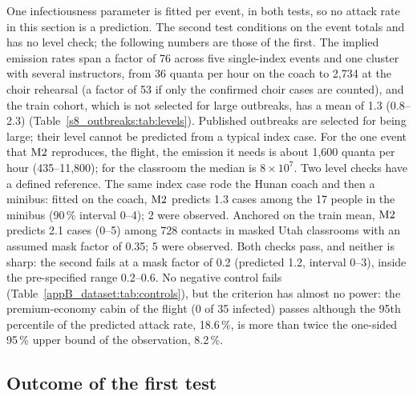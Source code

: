 One infectiousness parameter is fitted per event, in both tests, so no attack rate in this section is a
prediction. The second test conditions on the event totals and has no level check; the following numbers are
those of the first. The
implied emission rates span a factor of 76 across five single-index events and one cluster with several
instructors, from 36 quanta per hour on the coach to 2{,}734 at the choir rehearsal (a factor of 53 if only the confirmed choir cases are counted), and
the train cohort, which is not selected for large outbreaks, has a mean of 1.3 (0.8--2.3)
(Table~\ref{s8_outbreaks:tab:levels}). Published outbreaks are selected for being large; their level cannot be
predicted from a typical index case.
For the one event that $\mathrm{M2}$ reproduces, the flight, the emission it needs is about 1{,}600 quanta per hour
(435--11{,}800); for the classroom the median is $8\times10^{7}$.
Two level checks have a defined reference. The same index case rode the Hunan coach and then a minibus:
fitted on the coach, $\mathrm{M2}$ predicts 1.3 cases among the 17 people in the minibus (90\,\% interval 0--4); 2
were observed. Anchored on the train mean, $\mathrm{M2}$ predicts 2.1 cases (0--5) among 728 contacts in masked Utah
classrooms \citep{hershow2021} with an assumed mask factor of 0.35; 5 were observed. Both checks pass, and
neither is sharp: the second fails at a mask factor of 0.2 (predicted 1.2, interval 0--3), inside the
pre-specified range 0.2--0.6. No negative control fails (Table~\ref{appB_dataset:tab:controls}), but the
criterion has almost no power: the premium-economy cabin of the flight (0 of 35 infected) passes although the
95th percentile of the predicted attack rate, 18.6\,\%, is more than twice the one-sided 95\,\% upper bound
of the observation, 8.2\,\%.

\subsection{Outcome of the first test}\label{s8_outbreaks:sec:outcomedetail}

